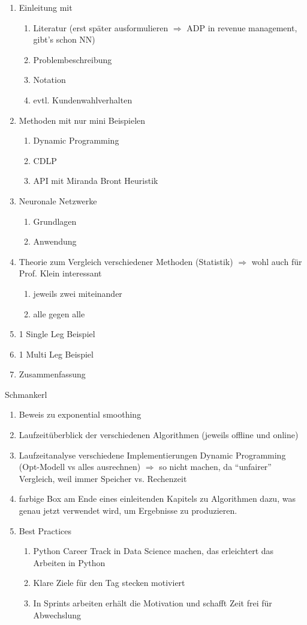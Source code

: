 \begin{enumerate}
	\item Einleitung mit 
	\begin{enumerate}
		\item Literatur (erst später ausformulieren $\Rightarrow$ ADP in revenue management, gibt's schon NN)
		\item Problembeschreibung
		\item Notation
		\item evtl. Kundenwahlverhalten
	\end{enumerate} 
	\item Methoden mit nur mini Beispielen
	\begin{enumerate}
		\item Dynamic Programming
		\item CDLP
		\item API mit Miranda Bront Heuristik
	\end{enumerate}
	\item Neuronale Netzwerke
	\begin{enumerate}
		\item Grundlagen
		\item Anwendung
	\end{enumerate}
	\item Theorie zum Vergleich verschiedener Methoden (Statistik) $\Rightarrow$ wohl auch für Prof. Klein interessant
	\begin{enumerate}
		\item jeweils zwei miteinander
		\item alle gegen alle
	\end{enumerate}
	\item 1 Single Leg Beispiel
	\item 1 Multi Leg Beispiel
	\item Zusammenfassung
\end{enumerate}

Schmankerl

\begin{enumerate}
	\item Beweis zu exponential smoothing
	\item Laufzeitüberblick der verschiedenen Algorithmen (jeweils offline und online)
	\item Laufzeitanalyse verschiedene Implementierungen Dynamic Programming (Opt-Modell vs alles ausrechnen) $\Rightarrow$ so nicht machen, da \enquote{unfairer} Vergleich, weil immer Speicher vs. Rechenzeit
	\item farbige Box am Ende eines einleitenden Kapitels zu Algorithmen dazu, was genau jetzt verwendet wird, um Ergebnisse zu produzieren.
	\item Best Practices
	\begin{enumerate}
		\item Python Career Track in Data Science machen, das erleichtert das Arbeiten in Python
		\item Klare Ziele für den Tag stecken motiviert
		\item In Sprints arbeiten erhält die Motivation und schafft Zeit frei für Abwechslung
	\end{enumerate}
\end{enumerate}